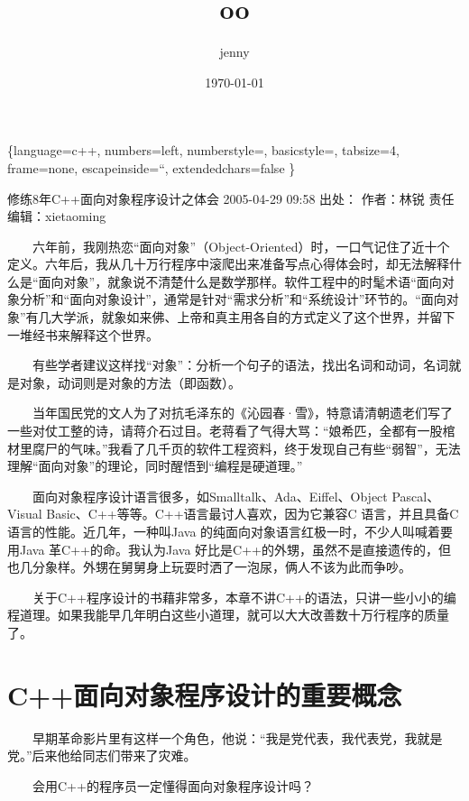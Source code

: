 \documentclass[11pt]{article}
\author{jenny}
\date{\today}
\title{oo}
\begin{document}
\maketitle
\tableofcontents

\usepackage{geometry}
\geometry{left=0cm,right=0cm,top=0cm,bottom=0cm}

\lstset\{language=c++,
numbers=left, 
numberstyle=\tiny,
basicstyle=\ttfamily\small,
tabsize=4,
frame=none, 
escapeinside=``, 
extendedchars=false
\}

修练8年C++面向对象程序设计之体会
2005-04-29 09:58  出处：  作者：林锐  责任编辑：xietaoming 

　　六年前，我刚热恋“面向对象”（Object-Oriented）时，一口气记住了近十个定义。六年后，我从几十万行程序中滚爬出来准备写点心得体会时，却无法解释什么是“面向对象”，就象说不清楚什么是数学那样。软件工程中的时髦术语“面向对象分析”和“面向对象设计”，通常是针对“需求分析”和“系统设计”环节的。“面向对象”有几大学派，就象如来佛、上帝和真主用各自的方式定义了这个世界，并留下一堆经书来解释这个世界。

　　有些学者建议这样找“对象”：分析一个句子的语法，找出名词和动词，名词就是对象，动词则是对象的方法（即函数）。

　　当年国民党的文人为了对抗毛泽东的《沁园春·雪》，特意请清朝遗老们写了一些对仗工整的诗，请蒋介石过目。老蒋看了气得大骂：“娘希匹，全都有一股棺材里腐尸的气味。”我看了几千页的软件工程资料，终于发现自己有些“弱智”，无法理解“面向对象”的理论，同时醒悟到“编程是硬道理。”

　　面向对象程序设计语言很多，如Smalltalk、Ada、Eiffel、Object Pascal、Visual Basic、C++等等。C++语言最讨人喜欢，因为它兼容C 语言，并且具备C 语言的性能。近几年，一种叫Java 的纯面向对象语言红极一时，不少人叫喊着要用Java 革C++的命。我认为Java 好比是C++的外甥，虽然不是直接遗传的，但也几分象样。外甥在舅舅身上玩耍时洒了一泡尿，俩人不该为此而争吵。

　　关于C++程序设计的书藉非常多，本章不讲C++的语法，只讲一些小小的编程道理。如果我能早几年明白这些小道理，就可以大大改善数十万行程序的质量了。

\section{C++面向对象程序设计的重要概念}
\label{sec-1}

　　早期革命影片里有这样一个角色，他说：“我是党代表，我代表党，我就是党。”后来他给同志们带来了灾难。

　　会用C++的程序员一定懂得面向对象程序设计吗？
\end{document}
